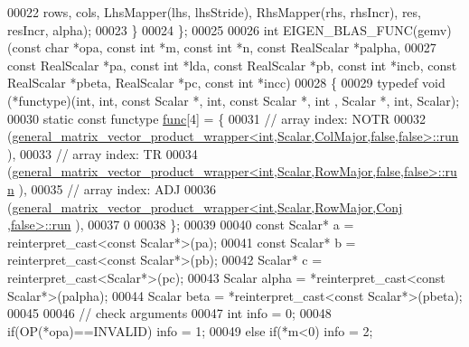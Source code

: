 \begin{DoxyCode}
00022         rows, cols, LhsMapper(lhs, lhsStride), RhsMapper(rhs, rhsIncr), res, resIncr, alpha);
00023   \}
00024 \};
00025 
00026 \textcolor{keywordtype}{int} EIGEN\_BLAS\_FUNC(gemv)(\textcolor{keyword}{const} \textcolor{keywordtype}{char} *opa, \textcolor{keyword}{const} \textcolor{keywordtype}{int} *m, \textcolor{keyword}{const} \textcolor{keywordtype}{int} *n, \textcolor{keyword}{const} RealScalar *palpha,
00027                           \textcolor{keyword}{const} RealScalar *pa, \textcolor{keyword}{const} \textcolor{keywordtype}{int} *lda, \textcolor{keyword}{const} RealScalar *pb, \textcolor{keyword}{const} \textcolor{keywordtype}{int} *incb, \textcolor{keyword}{
      const} RealScalar *pbeta, RealScalar *pc, \textcolor{keyword}{const} \textcolor{keywordtype}{int} *incc)
00028 \{
00029   \textcolor{keyword}{typedef} void (*functype)(int, int, \textcolor{keyword}{const} Scalar *, int, \textcolor{keyword}{const} Scalar *, int , Scalar *, int, Scalar);
00030   \textcolor{keyword}{static} \textcolor{keyword}{const} functype \hyperlink{structfunc}{func}[4] = \{
00031     \textcolor{comment}{// array index: NOTR}
00032     (\hyperlink{structgeneral__matrix__vector__product__wrapper}{general\_matrix\_vector\_product\_wrapper<int,Scalar,ColMajor,false,false>::run}
      ),
00033     \textcolor{comment}{// array index: TR  }
00034     (\hyperlink{structgeneral__matrix__vector__product__wrapper}{general\_matrix\_vector\_product\_wrapper<int,Scalar,RowMajor,false,false>::run}
      ),
00035     \textcolor{comment}{// array index: ADJ }
00036     (\hyperlink{structgeneral__matrix__vector__product__wrapper}{general\_matrix\_vector\_product\_wrapper<int,Scalar,RowMajor,Conj ,false>::run}
      ),
00037     0
00038   \};
00039 
00040   \textcolor{keyword}{const} Scalar* a = \textcolor{keyword}{reinterpret\_cast<}\textcolor{keyword}{const }Scalar*\textcolor{keyword}{>}(pa);
00041   \textcolor{keyword}{const} Scalar* b = \textcolor{keyword}{reinterpret\_cast<}\textcolor{keyword}{const }Scalar*\textcolor{keyword}{>}(pb);
00042   Scalar* c = \textcolor{keyword}{reinterpret\_cast<}Scalar*\textcolor{keyword}{>}(pc);
00043   Scalar alpha  = *\textcolor{keyword}{reinterpret\_cast<}\textcolor{keyword}{const }Scalar*\textcolor{keyword}{>}(palpha);
00044   Scalar beta   = *\textcolor{keyword}{reinterpret\_cast<}\textcolor{keyword}{const }Scalar*\textcolor{keyword}{>}(pbeta);
00045 
00046   \textcolor{comment}{// check arguments}
00047   \textcolor{keywordtype}{int} info = 0;
00048   \textcolor{keywordflow}{if}(OP(*opa)==INVALID)           info = 1;
00049   \textcolor{keywordflow}{else} \textcolor{keywordflow}{if}(*m<0)                   info = 2;

\end{DoxyCode}

